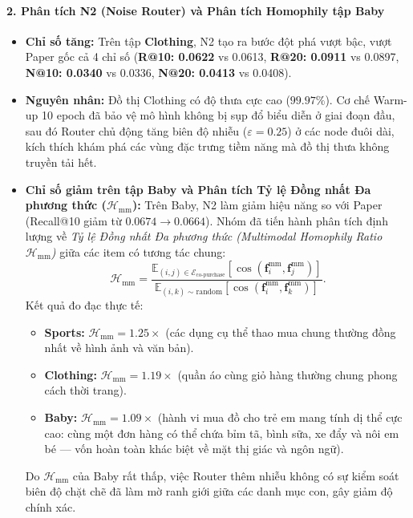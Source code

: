 \paragraph{2. Phân tích N2 (Noise Router) và Phân tích Homophily tập Baby}
\begin{itemize}[leftmargin=*]
  \item \textbf{Chỉ số tăng:} Trên tập \textbf{Clothing}, N2 tạo ra bước đột phá vượt bậc, vượt Paper gốc cả 4 chỉ số (\textbf{R@10: 0.0622} vs 0.0613, \textbf{R@20: 0.0911} vs 0.0897, \textbf{N@10: 0.0340} vs 0.0336, \textbf{N@20: 0.0413} vs 0.0408).
  \item \textbf{Nguyên nhân:} Đồ thị Clothing có độ thưa cực cao ($99.97\%$). Cơ chế Warm-up 10 epoch đã bảo vệ mô hình không bị sụp đổ biểu diễn ở giai đoạn đầu, sau đó Router chủ động tăng biên độ nhiễu ($\varepsilon = 0.25$) ở các node đuôi dài, kích thích khám phá các vùng đặc trưng tiềm năng mà đồ thị thưa không truyền tải hết.
  \item \textbf{Chỉ số giảm trên tập Baby và Phân tích Tỷ lệ Đồng nhất Đa phương thức ($\mathcal{H}_{\text{mm}}$):} 
  Trên Baby, N2 làm giảm hiệu năng so với Paper (Recall@10 giảm từ $0.0674 \to 0.0664$). Nhóm đã tiến hành phân tích định lượng về \textit{Tỷ lệ Đồng nhất Đa phương thức (Multimodal Homophily Ratio $\mathcal{H}_{\text{mm}}$)} giữa các item có tương tác chung:
  \begin{equation}
    \mathcal{H}_{\text{mm}} = \frac{\mathbb{E}_{(i, j) \in \mathcal{E}_{\text{co-purchase}}} [\cos(\mathbf{f}_i^{\text{mm}}, \mathbf{f}_j^{\text{mm}})]}{\mathbb{E}_{(i, k) \sim \text{random}} [\cos(\mathbf{f}_i^{\text{mm}}, \mathbf{f}_k^{\text{mm}})]}.
  \end{equation}
  Kết quả đo đạc thực tế:
  \begin{itemize}
    \item \textbf{Sports:} $\mathcal{H}_{\text{mm}} = \mathbf{1.25\times}$ (các dụng cụ thể thao mua chung thường đồng nhất về hình ảnh và văn bản).
    \item \textbf{Clothing:} $\mathcal{H}_{\text{mm}} = \mathbf{1.19\times}$ (quần áo cùng giỏ hàng thường chung phong cách thời trang).
    \item \textbf{Baby:} $\mathcal{H}_{\text{mm}} = \mathbf{1.09\times}$ (hành vi mua đồ cho trẻ em mang tính dị thể cực cao: cùng một đơn hàng có thể chứa bỉm tã, bình sữa, xe đẩy và nôi em bé --- vốn hoàn toàn khác biệt về mặt thị giác và ngôn ngữ).
  \end{itemize}
  Do $\mathcal{H}_{\text{mm}}$ của Baby rất thấp, việc Router thêm nhiễu không có sự kiểm soát biên độ chặt chẽ đã làm mờ ranh giới giữa các danh mục con, gây giảm độ chính xác.
\end{itemize}

